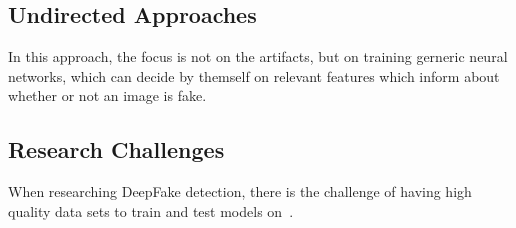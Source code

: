 \subsection{Undirected Approaches}
In this approach, the focus is not on the artifacts, but on training gerneric neural networks, which can decide by themself on relevant
features which inform about whether or not an image is fake.

\subsection{Research Challenges}
When researching DeepFake detection, there is the challenge of having high quality data sets to train and test models on~\cite{li_celeb-df_2019}.

